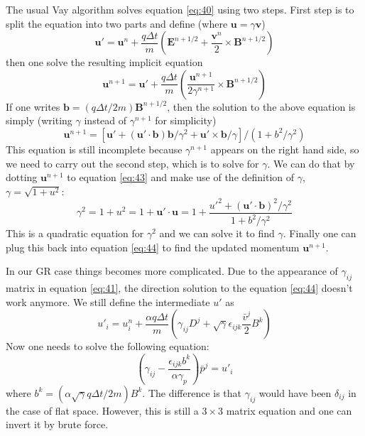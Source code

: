 The usual Vay algorithm solves equation \eqref{eq:40} using two steps. First
step is to split the equation into two parts and define (where $\mathbf{u} =
\gamma \mathbf{v}$)
\begin{equation}
  \label{eq:42}
  \mathbf{u}' = \mathbf{u}^n + \frac{q\Delta t}{m}\left( \mathbf{E}^{n+1/2} + \frac{\mathbf{v}^n}{2}\times \mathbf{B}^{n+1/2} \right)
\end{equation}
then one solve the resulting implicit equation
\begin{equation}
  \label{eq:43}
  \mathbf{u}^{n+1} = \mathbf{u}' + \frac{q\Delta t}{m}\left( \frac{\mathbf{u}^{n+1}}{2\gamma^{n+1}}\times \mathbf{B}^{n+1/2} \right)
\end{equation}
If one writes $\mathbf{b} = (q\Delta t/2m)\mathbf{B}^{n+1/2}$, then
the solution to the above equation is simply (writing $\gamma$ instead of
$\gamma^{n+1}$ for simplicity)
\begin{equation}
  \label{eq:44}
  \mathbf{u}^{n+1} = \left[ \mathbf{u}' + (\mathbf{u}'\cdot \mathbf{b})\mathbf{b}/\gamma^2 + \mathbf{u}'\times \mathbf{b}/\gamma \right] / (1 + b^2/\gamma^2)
\end{equation}
This equation is still incomplete because $\gamma^{n+1}$ appears on the right
hand side, so we need to carry out the second step, which is to solve for
$\gamma$. We can do that by dotting $\mathbf{u}^{n+1}$ to equation \eqref{eq:43}
and make use of the definition of $\gamma$, $\gamma = \sqrt{1 + u^2}$:
\begin{equation}
  \label{eq:45}
  \gamma^2 = 1 + u^2 = 1 + \mathbf{u}'\cdot \mathbf{u} = 1 + \frac{u'^2 + (\mathbf{u}'\cdot \mathbf{b})^2/\gamma^2}{1 + b^2/\gamma^2}
\end{equation}
This is a quadratic equation for $\gamma^2$ and we can solve it to find
$\gamma$. Finally one can plug this back into equation \eqref{eq:44} to find the
updated momentum $\mathbf{u}^{n+1}$.

In our GR case things becomes more complicated. Due to the appearance of
$\gamma_{ij}$ matrix in equation \eqref{eq:41}, the direction solution to the
equation \eqref{eq:44} doesn't work anymore. We still define the intermediate
$u'$ as
\begin{equation}
  \label{eq:47}
  u'_i = u_i^n + \frac{\alpha q\Delta t}{m}\left(\gamma_{ij}D^j + \sqrt{\gamma}\epsilon_{ijk}\frac{\bar{v}^j}{2}B^k\right)
\end{equation}
Now one needs to solve the following equation:
\begin{equation}
  \label{eq:46}
  \left( \gamma_{ij} - \frac{\epsilon_{ijk}b^k}{\alpha\gamma_p} \right)\bar{p}^j = u'_i
\end{equation}
where $b^k = (\alpha\sqrt{\gamma} q \Delta t/2m)B^{k}$. The difference is that
$\gamma_{ij}$ would have been $\delta_{ij}$ in the case of flat space. However,
this is still a $3\times 3$ matrix equation and one can invert it by brute
force.

